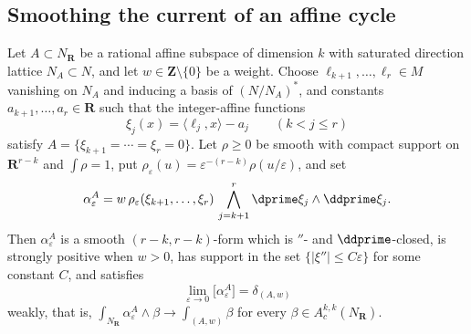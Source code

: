 \subsection{Smoothing the current of an affine cycle}
\label{sec:ch11-smoothing}

\begin{lemma}
\label{lem:ch11-linear-regularization}
Let $A\subset N_{\mathbf R}$ be a rational affine subspace of dimension $k$
with saturated direction lattice $N_A\subset N$, and let
$w\in\mathbf Z\setminus\{0\}$ be a weight.  Choose
$\ell_{k+1},\ldots,\ell_r\in M$ vanishing on $N_A$ and inducing a basis of
$(N/N_A)^*$, and constants $a_{k+1},\ldots,a_r\in\mathbf R$ such that the
integer-affine functions
\[
 \xi_j(x)=\langle\ell_j,x\rangle-a_j
 \qquad (k<j\le r)
\]
satisfy $A=\{\xi_{k+1}=\cdots=\xi_r=0\}$.  Let $\rho\ge0$ be smooth with
compact support on $\mathbf R^{r-k}$ and $\int\rho=1$, put
$\rho_\varepsilon(u)=\varepsilon^{-(r-k)}\rho(u/\varepsilon)$, and set
\[
 \alpha^A_\varepsilon
 =w\,\rho_\varepsilon(\xi_{k+1},\ldots,\xi_r)\,
   \bigwedge_{j=k+1}^r\dprime\xi_j\wedge\ddprime\xi_j .
\]
Then $\alpha^A_\varepsilon$ is a smooth $(r-k,r-k)$-form which is
$\dprime$- and $\ddprime$-closed, is strongly positive when $w>0$, has
support in the set $\{|\xi''|\le C\varepsilon\}$ for some constant $C$, and
satisfies
\[
 \lim_{\varepsilon\to0}\bigl[\alpha^A_\varepsilon\bigr]
 =\delta_{(A,w)}
\]
weakly, that is,
$\int_{N_{\mathbf R}}\alpha^A_\varepsilon\wedge\beta\to\int_{(A,w)}\beta$
for every $\beta\in A^{k,k}_c(N_{\mathbf R})$.
\end{lemma}

